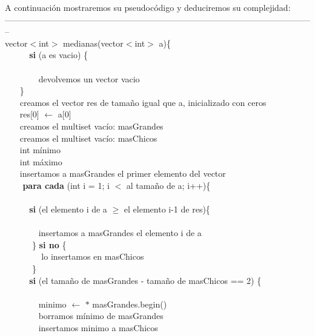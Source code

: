 A continuación mostraremos su pseudocódigo y deduciremos su complejidad: \\
--------------------------------------------------------------------------------------------------------------\\
vector$<$int$>$ medianas(vector$<$int$>$ a)\{ \\
$~~~~~~~~~~~~~$\textbf{si} (a es vacio) \{ \\ \\
$~~~~~~~~~~~~~~~~~~$devolvemos un vector vacio \\
$~~~~~~~~$\} \\
$~~~~~~~~$creamos el vector res de tamaño igual que a, inicializado con ceros \\
$~~~~~~~~$res[0] $\leftarrow$ a[0] \\
$~~~~~~~~$creamos el multiset vacío: masGrandes  \\
$~~~~~~~~$creamos el multiset vacío: masChicos  \\
$~~~~~~~~$int mínimo \\
$~~~~~~~~$int máximo \\
$~~~~~~~~$insertamos a masGrandes el primer elemento del vector  \\
$~~~~~~~~$ \textbf{para cada} (int i = 1; i $<$ al tamaño de a; i++)\{ \\  \\
$~~~~~~~~~~~~~$\textbf{si} (el elemento i de a $\geq$ el elemento i-1 de res)\{ \\  \\
$~~~~~~~~~~~~~~~~~~$insertamos a masGrandes el elemento i de a  \\
$~~~~~~~~~~~~~$ \} \textbf{si no} \{ \\
$~~~~~~~~~~~~~~~~~~$ lo insertamos en masChicos  \\
$~~~~~~~~~~~~~$ \} \\
$~~~~~~~~~~~~~$\textbf{si} (el tamaño de masGrandes - tamaño de masChicos == 2) \{ \\ \\
$~~~~~~~~~~~~~~~~~~$minimo $\leftarrow$ $\ast$ masGrandes.begin() \\
$~~~~~~~~~~~~~~~~~~$borramos mínimo de masGrandes   \\
$~~~~~~~~~~~~~~~~~~$insertamos minimo a masChicos  \\
